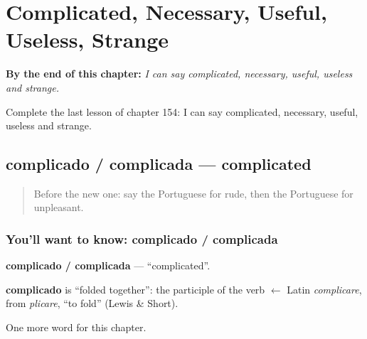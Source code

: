 
\chapter{Complicated, Necessary, Useful, Useless, Strange}
\label{ch:pt-complicated-necessary-useful-useless-strange}

\begin{chapteropening}
\textbf{By the end of this chapter:} \emph{I can say complicated, necessary, useful, useless and strange.}

Complete the last lesson of chapter 154: I can say complicated, necessary, useful, useless and strange.
\end{chapteropening}

\section[complicado / complicada]{complicado / complicada — complicated}

\label{lesson:PT-C154-complicado-complicada}



\begin{quote}
Before the new one: say the Portuguese for rude, then the Portuguese for unpleasant.
\end{quote}

\subsection*{You'll want to know: complicado / complicada}
\textbf{complicado / complicada} — \textquotedblleft{}complicated\textquotedblright{}.

\begin{cousinweb}
\textbf{complicado} is \textquotedblleft{}folded together\textquotedblright{}: the participle of the verb $\leftarrow$ Latin \emph{complicare}, from \emph{plicare}, \textquotedblleft{}to fold\textquotedblright{} (Lewis \& Short).
\end{cousinweb}

\begin{grammarlens}[title={What you've built}]
One more word for this chapter.
\end{grammarlens}

